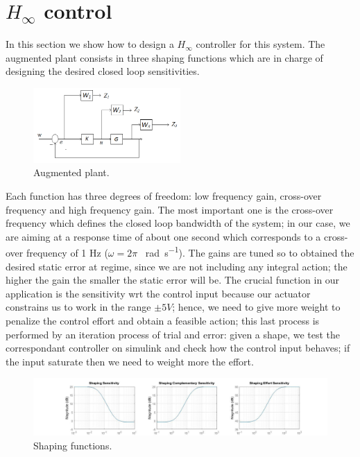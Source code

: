 \section{$H_{\infty}$ control}
In this section we show how to design a $H_{\infty}$ controller for this system. The augmented plant consists in three shaping functions which are in charge of designing the desired closed loop sensitivities.\\

\begin{figure}[h]
\centering
\includegraphics[width=0.5\textwidth]{img/hinf_scheme.png}
\caption{Augmented plant.}
\end{figure}
Each function has three degrees of freedom: low frequency gain, cross-over frequency and high frequency gain. The most important one is the cross-over frequency which defines the closed loop bandwidth of the system; in our case, we are aiming at a response time of about one second which corresponds to a cross-over frequency of 1 Hz ($\omega =2\pi $ \SI{}{\radian \per \second}). The gains are tuned so to obtained the desired static error at regime, since we are not including any integral action; the higher the gain the smaller the static error will be. The crucial function in our application is the sensitivity wrt the control input because our actuator constrains us to work in the range $\pm 5V$; hence, we need to give more weight to penalize the control effort and obtain a feasible action; this last process is performed by an iteration process of trial and error: given a shape, we test the correspondant controller on simulink and check how the control input behaves; if the input saturate then we need to weight more the effort.\\

\begin{figure}[h]
\centering
\includegraphics[width=1\textwidth]{img/hinf_shapes.jpg}
\caption{Shaping functions.}
\end{figure}

